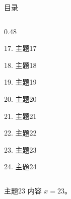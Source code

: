 \documentclass[aspectratio=169,10pt,fontset=fandol]{ctexbeamer}
\begin{document}
\begin{frame}[t,fragile]{目录}
\begin{columns}[T,onlytextwidth]
\begin{column}{0.48\textwidth}
{\color{black}\small 17. 主题17\par}\vspace{0.22em}
{\color{black}\small 18. 主题18\par}\vspace{0.22em}
{\color{black}\small 19. 主题19\par}\vspace{0.22em}
{\color{black}\small 20. 主题20\par}\vspace{0.22em}
{\color{black}\small 21. 主题21\par}\vspace{0.22em}
{\color{black}\small 22. 主题22\par}\vspace{0.22em}
{\color{blue}\small 23. 主题23\par}\vspace{0.22em}
{\color{gray!40}\small 24. 主题24\par}\vspace{0.22em}
\end{column}
\end{columns}
\end{frame}
\begin{frame}[t,fragile]{主题23}
\normalsize
{\normalsize
内容 $x=23$。
}
\end{frame}
\end{document}
